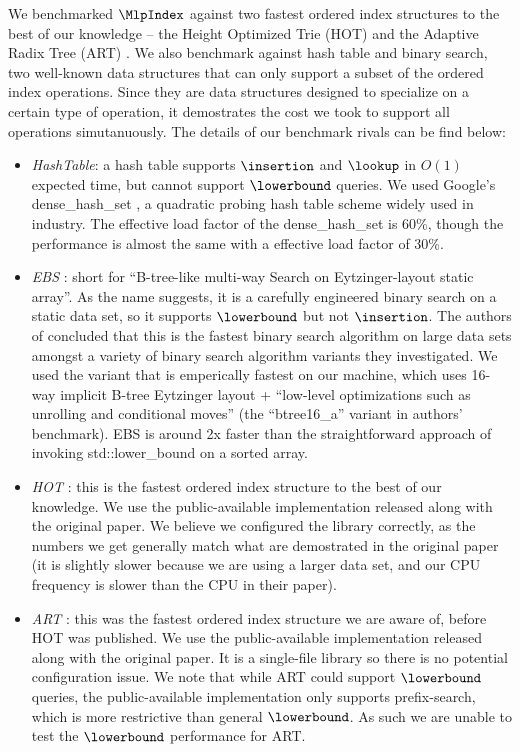 \documentclass[11pt, usletter]{article}
\begin{document}
We benchmarked $\MlpIndex$ against two fastest ordered index 
structures to the best of our knowledge -- the Height Optimized Trie (HOT) \cite{hot_sigmod18} and the Adaptive Radix Tree (ART) \cite{arttrie_icde13}.
We also benchmark against
hash table and binary search, two well-known data structures that can only support a subset of the ordered index operations. 
Since they are data structures designed to specialize on a certain type of operation, 
it demostrates the cost we took to support all operations simutanuously. 
The details of our benchmark rivals can be find below:
\begin{itemize}
[topsep=0pt,partopsep=0pt,itemsep=0pt,parsep=0pt,fullwidth,itemindent=\parindent,listparindent=\parindent]
\item \textit{HashTable}: a hash table supports $\insertion$ and $\lookup$ in $O(1)$ expected time, but cannot support $\lowerbound$ queries.
We used Google's dense\_hash\_set \cite{densehashset},
a quadratic probing hash table scheme widely used in industry.
The effective load factor of the dense\_hash\_set is 60\%, 
though the performance is almost the same with a effective load factor of 30\%.
\item \textit{EBS} \cite{binary_search_layout}: short for ``B-tree-like multi-way Search on Eytzinger-layout static array''. 
As the name suggests, it is a carefully engineered binary search on a static data set, 
so it supports $\lowerbound$ but not $\insertion$.
The authors of \cite{binary_search_layout} concluded that this is the fastest binary search algorithm on large data sets 
amongst a variety of binary search algorithm variants they investigated. 
We used the variant that is emperically fastest on our machine, which uses 16-way implicit B-tree Eytzinger layout
+ ``low-level optimizations such as unrolling and conditional moves''
(the ``btree16\_a'' variant in authors' benchmark). 
EBS is around 2x faster than the straightforward approach of invoking std::lower\_bound on a sorted array.
\item \textit{HOT} \cite{hot_sigmod18}: this is the fastest ordered index structure to the best of our knowledge. 
We use the public-available implementation released along with the original paper.
We believe we configured the library correctly,
as the numbers we get generally match what are demostrated in the original paper (it is slightly slower 
because we are using a larger data set, and our CPU frequency is slower than the CPU in their paper).
\item \textit{ART} \cite{arttrie_icde13}: this was the fastest ordered index structure we are aware of, before HOT was published.
We use the public-available implementation released along with the original paper.
It is a single-file library so there is no potential configuration issue.
We note that while ART could support $\lowerbound$ queries, 
the public-available implementation only supports prefix-search, 
which is more restrictive than general $\lowerbound$. 
As such we are unable to test the $\lowerbound$ performance for ART.
\end{itemize}
\end{document}
